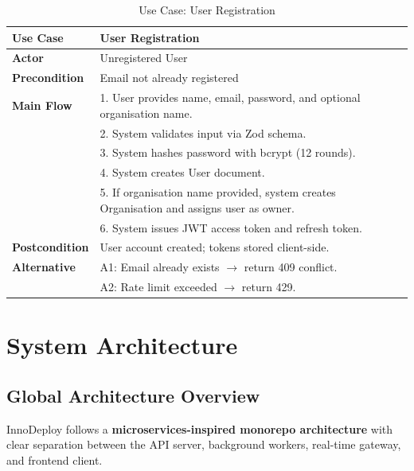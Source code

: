 \documentclass[12pt,a4paper,twoside]{report}
\begin{document}
\begin{table}[H]
\centering
\caption{Use Case: User Registration}
\begin{tabularx}{\textwidth}{l|X}
\toprule
\textbf{Use Case} & User Registration \\
\midrule
\textbf{Actor} & Unregistered User \\
\textbf{Precondition} & Email not already registered \\
\textbf{Main Flow} & 1. User provides name, email, password, and optional organisation name. \\
& 2. System validates input via Zod schema. \\
& 3. System hashes password with bcrypt (12 rounds). \\
& 4. System creates User document. \\
& 5. If organisation name provided, system creates Organisation and assigns user as owner. \\
& 6. System issues JWT access token and refresh token. \\
\textbf{Postcondition} & User account created; tokens stored client-side. \\
\textbf{Alternative} & A1: Email already exists $\rightarrow$ return 409 conflict. \\
& A2: Rate limit exceeded $\rightarrow$ return 429. \\
\bottomrule
\end{tabularx}
\end{table}


\chapter{System Architecture}

\section{Global Architecture Overview}

InnoDeploy follows a \textbf{microservices-inspired monorepo architecture} with clear separation between the API server, background workers, real-time gateway, and frontend client.
\end{document}
